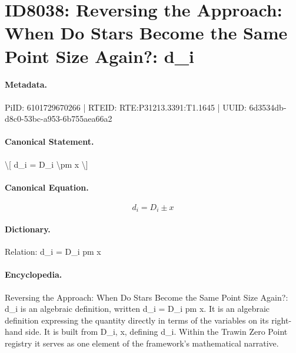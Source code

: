 \section*{ID8038: Reversing the Approach: When Do Stars Become the Same Point Size Again?: d\_i}
\paragraph{Metadata.}
PiID: 6101729670266 | RTEID: RTE:P31213.3391:T1.1645 | UUID: 6d3534db-d8c0-53bc-a953-6b755aea66a2

\paragraph{Canonical Statement.}
\textbackslash{}[ d\_i = D\_i \textbackslash{}pm x \textbackslash{}]

\paragraph{Canonical Equation.}
\[
d_i = D_i \pm x
\]

\paragraph{Dictionary.}
Relation: d\_i = D\_i pm x

\paragraph{Encyclopedia.}
Reversing the Approach: When Do Stars Become the Same Point Size Again?: d\_i is an algebraic definition, written d\_i = D\_i pm x. It is an algebraic definition expressing the quantity directly in terms of the variables on its right-hand side. It is built from D\_i, x, defining d\_i. Within the Trawin Zero Point registry it serves as one element of the framework's mathematical narrative.
